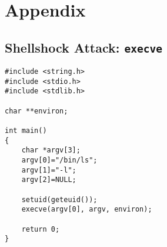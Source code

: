 \documentclass[a4paper,12pt]{article}
\begin{document}
\section{Appendix}
\subsection{Shellshock Attack: \texttt{execve}}
\begin{verbatim}
#include <string.h>
#include <stdio.h>
#include <stdlib.h>

char **environ;

int main()
{
    char *argv[3];
    argv[0]="/bin/ls";
    argv[1]="-l";
    argv[2]=NULL;

    setuid(geteuid());
    execve(argv[0], argv, environ);

    return 0;
}
\end{verbatim}


















	
\end{document}
